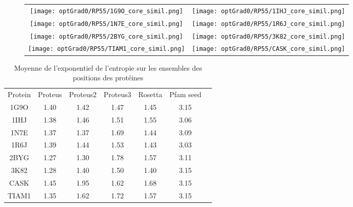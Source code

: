     \clearpage
    \thispagestyle{empty}
   \begin{figure}[t]
     \centering
     \begin{tabular}{cc}
       \texttt{[image: optGrad0/RP55/1G9O\_core\_simil.png]} &
       \texttt{[image: optGrad0/RP55/1IHJ\_core\_simil.png]} \\
       \texttt{[image: optGrad0/RP55/1N7E\_core\_simil.png]} &
       \texttt{[image: optGrad0/RP55/1R6J\_core\_simil.png]} \\
       \texttt{[image: optGrad0/RP55/2BYG\_core\_simil.png]} &
       \texttt{[image: optGrad0/RP55/3K82\_core\_simil.png]} \\
       \texttt{[image: optGrad0/RP55/TIAM1\_core\_simil.png]} &
       \texttt{[image: optGrad0/RP55/CASK\_core\_simil.png]} \\ 
     \end{tabular}

\label{graph:Simil_Proteus_PDZ}
   \end{figure}

    \clearpage

    \begin{table}[!htbp]
      \centering

      \begin{tabular}{ccccccc}

        \toprule
        Protein & Proteus &  Proteus2 &  Proteus3 & Rosetta & Pfam seed \\
        \cmidrule{1-6}
        1G9O  & 1.40 & 1.42 & 1.47 & 1.45 & 3.15  \\
        1IHJ  & 1.38 & 1.46 & 1.51 & 1.55 & 3.06  \\
        1N7E  & 1.37 & 1.37 & 1.69 & 1.44 & 3.09  \\
        1R6J  & 1.39 & 1.44 & 1.53 & 1.43 & 3.03  \\
        2BYG  & 1.27 & 1.30 & 1.78 & 1.57 & 3.11  \\
        3K82  & 1.28 & 1.40 & 1.50 & 1.40 & 3.15  \\
        CASK  & 1.45 & 1.95 & 1.62 & 1.68 & 3.15  \\
        TIAM1 & 1.35 & 1.62 & 1.72 & 1.57 & 3.15  \\
        \bottomrule

      \end{tabular}      
      \caption{Moyenne de l'exponentiel de l'entropie sur les ensembles des positions des protéines}
\label{tab:Entropie_PDZ}      
    \end{table}


